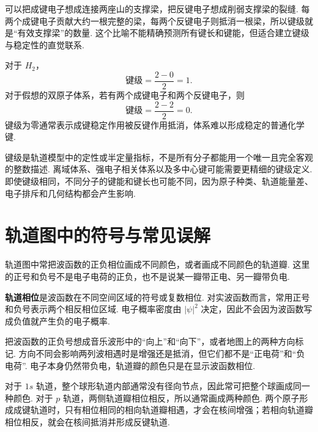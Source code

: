 \documentclass[UTF8,11pt,a4paper,openany]{ctexbook}
\newcommand{\term}[1]{\textbf{#1}}
\begin{document}
\begin{analogybox}
可以把成键电子想成连接两座山的支撑梁，把反键电子想成削弱支撑梁的裂缝. 每两个成键电子贡献大约一根完整的梁，每两个反键电子则抵消一根梁，所以键级就是“有效支撑梁”的数量. 这个比喻不能精确预测所有键长和键能，但适合建立键级与稳定性的直觉联系. 
\end{analogybox}

\begin{examplebox}
对于 $H_2$，
\[
\text{键级}=\frac{2-0}{2}=1.
\]
对于假想的双原子体系，若有两个成键电子和两个反键电子，则
\[
\text{键级}=\frac{2-2}{2}=0.
\]
键级为零通常表示成键稳定作用被反键作用抵消，体系难以形成稳定的普通化学键. 
\end{examplebox}

\begin{limitbox}
键级是轨道模型中的定性或半定量指标，不是所有分子都能用一个唯一且完全客观的整数描述. 离域体系、强电子相关体系以及多中心键可能需要更精细的键级定义. 即使键级相同，不同分子的键能和键长也可能不同，因为原子种类、轨道能量差、电子排斥和几何结构都会产生影响. 
\end{limitbox}

\section{轨道图中的符号与常见误解}

轨道图中常把波函数的正负相位画成不同颜色，或者画成不同颜色的轨道瓣. 这里的正号和负号不是电子电荷的正负，也不是说某一瓣带正电、另一瓣带负电. 

\begin{definitionbox}
\term{轨道相位}是波函数在不同空间区域的符号或复数相位. 对实波函数而言，常用正号和负号表示两个相反相位区域. 电子概率密度由 $|\psi|^2$ 决定，因此不会因为波函数写成负值就产生负的电子概率. 
\end{definitionbox}

\begin{analogybox}
把波函数的正负号想成音乐波形中的“向上”和“向下”，或者地图上的两种方向标记. 方向不同会影响两列波相遇时是增强还是抵消，但它们都不是“正电荷”和“负电荷”. 电子本身仍然带负电，轨道瓣的颜色只是在显示波函数相位. 
\end{analogybox}

对于 $1s$ 轨道，整个球形轨道内部通常没有径向节点，因此常可把整个球画成同一种颜色. 对于 $p$ 轨道，两侧轨道瓣相位相反，所以通常画成两种颜色. 两个原子形成成键轨道时，只有相位相同的相向轨道瓣相遇，才会在核间增强；若相向轨道瓣相位相反，就会在核间抵消并形成反键轨道. 
\end{document}
